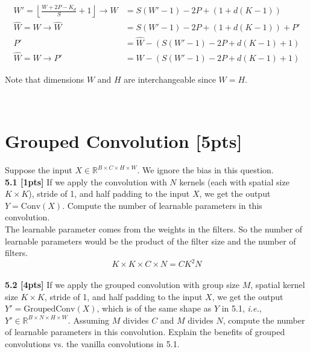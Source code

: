 \documentclass{article}
\begin{document}
{\color{blue}
\begin{equation}
    \begin{aligned}
       W'= \left \lfloor \frac{W+2P-K_d}{S}+1 \right \rfloor \rightarrow W&=S(W'-1)-2P+(1+d(K-1))\\
       \hat{W}=W \rightarrow \hat{W}&=S(W'-1)-2P+(1+d(K-1))+P'\\
       P'&=\hat{W}-(S(W'-1)-2P+d(K-1)+1)\\
       \hat{W}=W \rightarrow P'&=W- \left(S(W'-1)-2P+d(K-1)+1 \right)
    \end{aligned}
\end{equation}

Note that dimensions $W$ and $H$ are interchangeable since $W=H$.
}\\

\section{Grouped Convolution [5pts]}
\noindent
Suppose the input $X \in \mathbb{R}^{B \times C \times H \times W}$. We ignore the bias in this question.\\

\noindent
\textbf{5.1 [1pts]} If we apply the convolution with $N$ kernels (each with spatial size $K \times K$), stride of 1, and half padding to the input $X$, we get the output $Y = \text{Conv}(X)$. Compute the number of learnable parameters in this convolution.\\

{\color{blue}
The learnable parameter comes from the weights in the filters. So the number of learnable parameters would be the product of the filter size and the number of filters.
\begin{equation}
    K \times K \times C \times N=CK^2N
\end{equation}
}\\

\noindent
\textbf{5.2 [4pts]} If we apply the grouped convolution with group size $M$, spatial kernel size $K \times K$, stride of 1, and half padding to the input $X$, we get the output $Y' = \text{GroupedConv}(X)$, which is of the same shape as $Y$ in 5.1, \textit{i.e.}, $Y' \in \mathbb{R}^{B \times N \times H \times W}$. Assuming $M$ divides $C$ and $M$ divides $N$, compute the number of learnable parameters in this convolution. Explain the benefits of grouped convolutions vs. the vanilla convolutions in 5.1.\\
\end{document}
